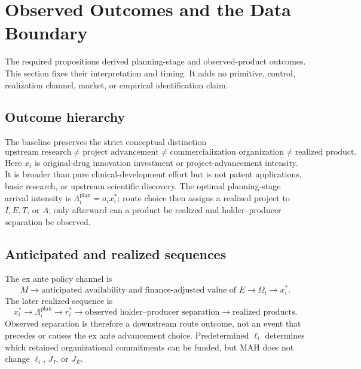 \section{Observed Outcomes and the Data Boundary}
\label{sec:p09-outcomes}

The required propositions derived planning-stage and observed-product outcomes.
This section fixes their interpretation and timing. It adds no primitive, control,
realization channel, market, or empirical identification claim.

\subsection{Outcome hierarchy}
\label{subsec:p09-hierarchy}

The baseline preserves the strict conceptual distinction
\begin{equation}
  \boxed{
  \text{upstream research}
  \neq
  \text{project advancement}
  \neq
  \text{commercialization organization}
  \neq
  \text{realized product}.}
  \label{eq:p09-outcome-hierarchy}
\end{equation}
Here \(x_i\) is original-drug innovation investment or
project-advancement intensity. It is broader than pure clinical-development
effort but is not patent applications, basic research, or upstream scientific
discovery. The optimal planning-stage arrival intensity is
\(\Lambda_i^{\mathrm{plan}}=a_ix_i^*\); route choice then assigns a realized
project to \(I,E,T\), or \(A\); only afterward can a product be realized and
holder--producer separation be observed.

\subsection{Anticipated and realized sequences}
\label{subsec:p09-sequences}

The ex ante policy channel is
\begin{equation}
  M
  \longrightarrow
  \text{anticipated availability and finance-adjusted value of }E
  \longrightarrow
  \Omega_i
  \longrightarrow
  x_i^*.
  \label{eq:p09-anticipated-chain}
\end{equation}
The later realized sequence is
\begin{equation}
  x_i^*
  \longrightarrow
  \Lambda_i^{\mathrm{plan}}
  \longrightarrow
  r_i^*
  \longrightarrow
  \text{observed holder--producer separation}
  \longrightarrow
  \text{realized products}.
  \label{eq:p09-realized-chain}
\end{equation}
Observed separation is therefore a downstream route outcome, not an event
that precedes or causes the ex ante advancement choice.
Predetermined \(\ell_i\) determines which retained organizational commitments
can be funded, but MAH does not change \(\ell_i\), \(J_I\), or \(J_E\).

